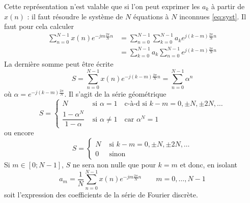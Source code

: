 \newpage
Cette représentation n'est valable que si l'on peut exprimer les $a_k$ à partir de 
$x(n)$ : il faut résoudre le système de $N$ équations à $N$ inconnues \autoref{eq:syst}. 
Il faut pour cela calculer
\begin{equation}
\begin{array}{ll}
\displaystyle\sum_{n=0}^{N-1} x(n)e^{-jm\frac{2\pi}{N}n} &= \displaystyle\sum_{n=0}^{N-1}
\sum_{k=0}^{N-1} a_k e^{j(k-m)\frac{2\pi}{N}n}\\
&=\displaystyle \sum_{k=0}^{N-1} a_k \sum_{n=0}^{N-1} e^{j(k-m)\frac{2\pi}{N}n}
\end{array}
\end{equation}
La dernière somme peut être écrite
\begin{equation}
S = \sum_{n=0}^{N-1}x(n) e^{-j(k-m)\frac{2\pi}{N}n}  = \sum_{n=0}^{N-1} \alpha^n
\end{equation}
où $\displaystyle \alpha = e^{-j(k-m)\frac{2\pi}{N}}$. Il s'agit de la série géométrique
\begin{equation}
S = \left\{\begin{array}{ll}
N & \text{ si } \alpha = 1\quad \text{c-à-d si } k-m=0,\pm N,\pm 2N,\dots\\
\dfrac{1-\alpha^N}{1-\alpha} & \text{ si } \alpha \neq 1\quad \text{car } 
\alpha^N = 1
\end{array}\right.
\end{equation}
ou encore
\begin{equation}
S=\left\{\begin{array}{ll}
N &\text{ si } k-m = 0,\pm N, \pm 2N,\dots\\
0 &\text{ sinon}
\end{array}\right.
\end{equation}
Si $m\in[0;N-1]$, $S$ ne sera non nulle que pour $k=m$ et donc, en isolant
\begin{equation}
a_m = \frac{1}{N}\sum_{n=0}^{N-1} x(n)e^{-jm\frac{2\pi}{N}n}\qquad m=0,\dots,N-1
\label{eq:nouv}
\end{equation}
soit l'expression des coefficients de la série de Fourier discrète.


	\ \\
	
